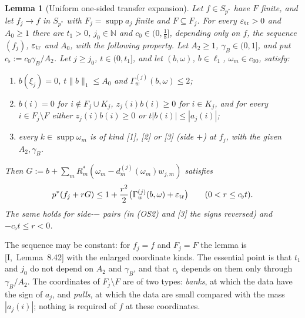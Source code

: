 \documentclass[10pt]{amsart}
\newtheorem{lemma}[theorem]{Lemma}
\theoremstyle{definition}
\theoremstyle{remark}
\newcommand{\supp}{\operatorname{supp}}
\newcommand{\N}{\mathbb N}
\begin{document}
\begin{lemma}[Uniform one-sided transfer expansion]\label{lem:II-U}
Let $f\in S_{p^*}$ have $F$ finite, and let $f_j\to f$ in $S_{p^*}$ with
$F_j=\supp a_j$ finite and $F\subseteq F_j$.  For every $\varepsilon_{\rm tr}>0$
and $A_0\ge1$ there are $t_1>0$, $j_0\in\N$ and $c_0\in(0,\frac18]$,
depending only on $f$, the sequence $(f_j)$, $\varepsilon_{\rm tr}$ and
$A_0$, with the following property.  Let $A_2\ge1$, $\gamma_B\in(0,1]$, and
put $c_\flat:=c_0\gamma_B/A_2$.  Let $j\ge j_0$, $t\in(0,t_1]$, and let
$(b,\omega)$, $b\in\ell_1$, $\omega_m\in c_{00}$, satisfy:
\begin{enumerate}
\item[(OS1)] $b(\xi_j)=0$, $t\|b\|_1\le A_0$ and $\Gamma^{(j)}_w(b,\omega)\le2$;
\item[(OS2)] $b(i)=0$ for $i\notin F_j\cup K_j$, $z_j(i)b(i)\ge0$ for $i\in
K_j$, and for every $i\in F_j\setminus F$ either $z_j(i)b(i)\ge0$ or
$t|b(i)|\le|a_j(i)|$;
\item[(OS3)] every $k\in\supp\omega_m$ is of kind \textup{[1]}, \textup{[2]}
or \textup{[3]} \textup{(}side $+$\textup{)} at $f_j$, with the given $A_2,
\gamma_B$.
\end{enumerate}
Then $G:=b+\sum_mR_m^*(\omega_m-d^{(j)}_m(\omega_m)w_{j,m})$ satisfies
\[
 p^*(f_j+rG)\le1+\frac{r^2}2\big(\Gamma^{(j)}_w(b,\omega)+\varepsilon_{\rm tr}
 \big)\qquad(0<r\le c_\flat t).
\]
The same holds for side-$-$ pairs \textup{(}in \textup{(OS2)} and \textup{[3]}
the signs reversed\textup{)} and $-c_\flat t\le r<0$.
\end{lemma}

The sequence may be constant: for $f_j=f$ and $F_j=F$ the lemma is
[I,~Lemma~8.42] with the enlarged coordinate kinds.  The essential point is
that $t_1$ and $j_0$ do not depend on $A_2$ and $\gamma_B$, and that $c_\flat$
depends on them only through $\gamma_B/A_2$.  The coordinates of
$F_j\setminus F$ are of two types: \emph{banks}, at which the data have the
sign of $a_j$, and \emph{pulls}, at which the data are small compared with
the mass $|a_j(i)|$; nothing is required of $f$ at these coordinates.
\end{document}

